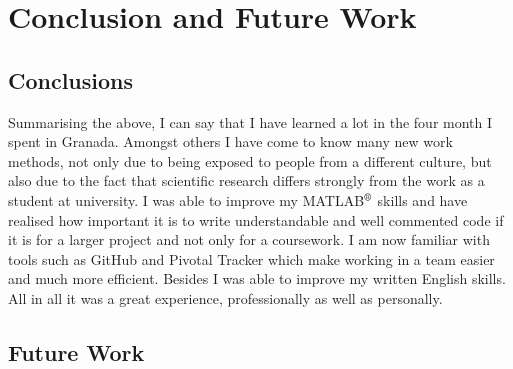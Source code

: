 \chapter{Conclusion and Future Work}
\label{ch:Conclusion and Future Work}

\section{Conclusions}

Summarising the above, I can say that I have learned a lot in the four month I spent in Granada. Amongst others I have come to know many new work methods, not only due to being exposed to people from a different culture, but also due to the fact that scientific research differs strongly from the work as a student at university. I was able to improve my MATLAB$\textsuperscript{\textregistered}$ skills and have realised how important it is to write understandable and well commented code if it is for a larger project and not only for a coursework. I am now familiar with tools such as GitHub and Pivotal Tracker which make working in a team easier and much more efficient.  Besides I was able to improve my written English skills. All in all it was a great experience, professionally as well as personally.

\section{Future Work}